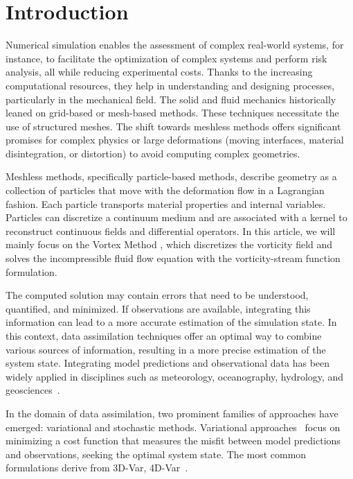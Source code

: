 
\section{Introduction}


Numerical simulation enables the assessment of complex real-world systems, for instance, to facilitate the optimization of complex systems and perform risk analysis, all while reducing experimental costs. Thanks to the increasing computational resources, they help in understanding and designing processes, particularly in the mechanical field.
The solid and fluid mechanics historically leaned on grid-based or mesh-based methods. These techniques necessitate the use of structured meshes. The shift towards meshless methods offers significant promises for complex physics or large deformations (moving interfaces, material disintegration, or distortion) to avoid computing complex geometries.

Meshless methods, specifically particle-based methods, describe geometry as a collection of particles that move with the deformation flow in a Lagrangian fashion. Each particle transports material properties and internal variables. Particles can discretize a continuum medium and are associated with a kernel to reconstruct continuous fields and differential operators. In this article, we will mainly focus on the Vortex Method \cite{cottet_vortex_2000,mimeau_review_2021}, which discretizes the vorticity field and solves the incompressible fluid flow equation with the vorticity-stream function formulation.
\newline

The computed solution may contain errors that need to be understood, quantified, and minimized. If observations are available, integrating this information can lead to a more accurate estimation of the simulation state. In this context, data assimilation techniques offer an optimal way to combine various sources of information, resulting in a more precise estimation of the system state. Integrating model predictions and observational data has been widely applied in disciplines such as meteorology, oceanography, hydrology, and geosciences~\cite{bocquet_introduction_2014}.

In the domain of data assimilation, two prominent families of approaches have emerged: variational and stochastic methods. Variational approaches~\cite{variational_method} focus on minimizing a cost function that measures the misfit between model predictions and observations, seeking the optimal system state. The most common formulations derive from 3D-Var, 4D-Var~\cite{talagrand1997assimilation}.

